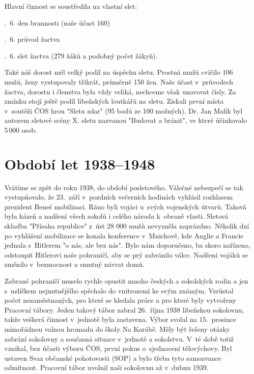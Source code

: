 \documentclass[a5paper, 11pt, twoside]{article}
\begin{document}
\smallskip
\noindent Hlavní činnost se soustředila na vlastní slet:

.~6. den brannosti (naše účast 160)

.~6. průvod žactva

.~6. slet žactva (279 žáků a podobný počet žákyň).

\smallskip
Také náš dorost měl velký podíl na úspěchu sletu. Prostná mužů cvičilo
106 mužů, ženy vystupovaly třikrát, průměrně 150 žen. Naše účast
v~průvodech žactva, dorostu i členstva byla vždy veliká, nechceme však
unavovat čísly. Za zmínku stojí ještě podíl libeňských loutkářů na
sletu. Získali první místa v~soutěži ČOS hrou "Sletu zdar" (95 bodů ze
100 možných). Dr. Jan Malík byl autorem sletové scény X. sletu nazvanou
"Budovat a bránit", ve které účinkovalo 5\,000 osob.

\section{Období let 1938--1948}

Vrátíme se zpět do roku 1938, do období posletového. Válečné nebezpečí
se tak vystupňovalo, že 23.~září v~pozdních večerních hodinách vyhlásil
rozhlasem prezident Beneš mobilizaci. Ráno byli vojáci u~svých
vojenských útvarů. Taková byla kázeň a nadšení všech sokolů i celého
národa k~obraně vlasti. Sletová skladba "Přísaha republice" z~úst 28
000 mužů nevyzněla naprázdno. Několik dní po vyhlášení mobilizace se
konala konference v~Mnichově, kde Anglie a Francie jednala s~Hitlerem "o
nás, ale bez nás". Bylo nám doporučeno, ba skoro nařízeno, odstoupit
Hitlerovi naše pohraničí, aby se prý zabránilo válce. Nadšení vojáků se
změnilo v~bezmocnost a smutný návrat domů.

Zabrané pohraničí muselo rychle opustit mnoho českých a sokolských rodin
a jen s~uzlíčkem nejnutnějšího spěchalo do vnitrozemí ke svým známým.
Vzrůstal počet nezaměstnaných, pro které se hledala práce a pro které
byly vytvořeny Pracovní tábory. Jeden takový tábor zabral 26.~října 1938
libeňskou sokolovnu, takže veškerá činnost v~jednotě byla zastavena.
Výbor svolal na 15.~prosince mimořádnou valnou hromadu do školy Na
Korábě. Měly být řešeny otázky zabrání sokolovny a současná situace
v~jednotě a sokolstvu. V~té době totiž vznikal, bez účasti výboru ČOS,
první pokus o~sjednocení tělovýchovy. Byl ustaven Svaz občanské
pohotovosti (SOP) a bylo třeba tyto samozvance odmítnout. Pracovní tábor
uvolnil naši sokolovnu až v~dubnu 1939.
\end{document}
